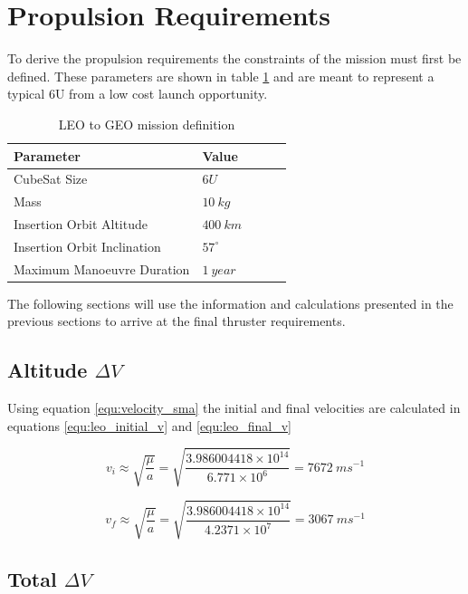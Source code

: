 \documentclass[a4paper, article, oneside, UKenglish]{memoir}
\newcommand{\0}{\mathbf{0}}
\newcommand{\1}{\mathbf{1}}
\begin{document}
\section{Propulsion Requirements}

To derive the propulsion requirements the constraints of the mission must first be defined.  These parameters are shown in table \ref{tab:leo_to_geo_definition} and are meant to represent a typical 6U from a low cost launch opportunity.

\begin{table}[h]
\centering
\begin{tabular}{@{}lllll@{}}
\toprule
Parameter					& Value			\\ \midrule
CubeSat Size				& $6U$			\\
Mass  						& $10~kg$		\\
Insertion Orbit Altitude	& $400~km$		\\
Insertion Orbit Inclination	& $57^\circ$	\\
Maximum Manoeuvre Duration 	& $1~year$		\\ \bottomrule
\end{tabular}
\captionsetup{justification=centering}
\caption{LEO to GEO mission definition}
\label{tab:leo_to_geo_definition}
\end{table}

The following sections will use the information and calculations presented in the previous sections to arrive at the final thruster requirements.


\subsection{Altitude $\Delta V$}

Using equation \ref{equ:velocity_sma} the initial and final velocities are calculated in equations \ref{equ:leo_initial_v} and \ref{equ:leo_final_v}

\begin{equation}
v_i \approx \sqrt{ \frac{ \mu }{a} } = \sqrt{ \frac{ 3.986004418 \times 10^{14} }{6.771 \times 10^{6}} } = 7672~ms^{-1}
\label{equ:leo_initial_v}
\end{equation}

\begin{equation}
v_f \approx \sqrt{ \frac{ \mu }{a} } = \sqrt{ \frac{ 3.986004418 \times 10^{14} }{4.2371 \times 10^{7}} } = 3067~ms^{-1} 
\label{equ:leo_final_v}
\end{equation}


\subsection{Total $\Delta V$}
\end{document}

